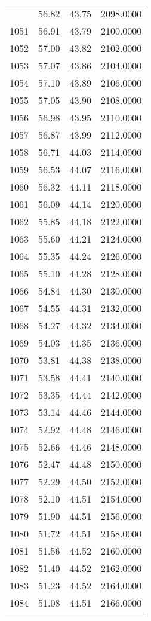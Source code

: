 \documentclass[
  captions=tableheading,
]{scrartcl}
\begin{document}
\begin{longtable} {l|l|l|l}
{1050 &	56.82 &	43.75 &	2098.0000\\
1051 &	56.91 &	43.79 &	2100.0000\\
1052 &	57.00 &	43.82 &	2102.0000\\
1053 &	57.07 &	43.86 &	2104.0000\\
1054 &	57.10 &	43.89 &	2106.0000\\
1055 &	57.05 &	43.90 &	2108.0000\\
1056 &	56.98 &	43.95 &	2110.0000\\
1057 &	56.87 &	43.99 &	2112.0000\\
1058 &	56.71 &	44.03 &	2114.0000\\
1059 &	56.53 &	44.07 &	2116.0000\\
1060 &	56.32 &	44.11 &	2118.0000\\
1061 &	56.09 &	44.14 &	2120.0000\\
1062 &	55.85 &	44.18 &	2122.0000\\
1063 &	55.60 &	44.21 &	2124.0000\\
1064 &	55.35 &	44.24 &	2126.0000\\
1065 &	55.10 &	44.28 &	2128.0000\\
1066 &	54.84 &	44.30 &	2130.0000\\
1067 &	54.55 &	44.31 &	2132.0000\\
1068 &	54.27 &	44.32 &	2134.0000\\
1069 &	54.03 &	44.35 &	2136.0000\\
1070 &	53.81 &	44.38 &	2138.0000\\
1071 &	53.58 &	44.41 &	2140.0000\\
1072 &	53.35 &	44.44 &	2142.0000\\
1073 &	53.14 &	44.46 &	2144.0000\\
1074 &	52.92 &	44.48 &	2146.0000\\
1075 &	52.66 &	44.46 &	2148.0000\\
1076 &	52.47 &	44.48 &	2150.0000\\
1077 &	52.29 &	44.50 &	2152.0000\\
1078 &	52.10 &	44.51 &	2154.0000\\
1079 &	51.90 &	44.51 &	2156.0000\\
1080 &	51.72 &	44.51 &	2158.0000\\
1081 &	51.56 &	44.52 &	2160.0000\\
1082 &	51.40 &	44.52 &	2162.0000\\
1083 &	51.23 &	44.52 &	2164.0000\\
1084 &	51.08 &	44.51 &	2166.0000\\
}
\end{longtable}
\end{document}

